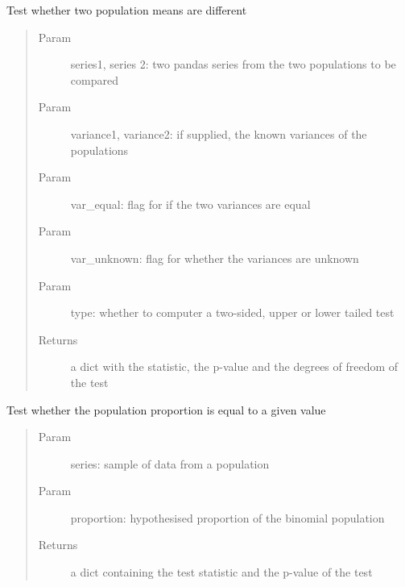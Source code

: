 \documentclass[letterpaper,10pt,english]{sphinxmanual}
\begin{document}

\begin{fulllineitems}
\label{index:tests.tests.test_means}
Test whether two population means are different
\begin{quote}\begin{description}
\item[{Param}] \leavevmode
series1, series 2: two pandas series from the two populations to be compared

\item[{Param}] \leavevmode
variance1, variance2: if supplied, the known variances of the populations

\item[{Param}] \leavevmode
var\_equal: flag for if the two variances are equal

\item[{Param}] \leavevmode
var\_unknown: flag for whether the variances are unknown

\item[{Param}] \leavevmode
type: whether to computer a two-sided, upper or lower tailed test

\item[{Returns}] \leavevmode
a dict with the statistic, the p-value and the degrees of freedom of the test

\end{description}\end{quote}

\end{fulllineitems}


\begin{fulllineitems}
\label{index:tests.tests.test_proportion}
Test whether the population proportion is equal to a given value
\begin{quote}\begin{description}
\item[{Param}] \leavevmode
series: sample of data from a population

\item[{Param}] \leavevmode
proportion: hypothesised proportion of the binomial population

\item[{Returns}] \leavevmode
a dict containing the test statistic and the p-value of the test

\end{description}\end{quote}

\end{fulllineitems}
\end{document}
